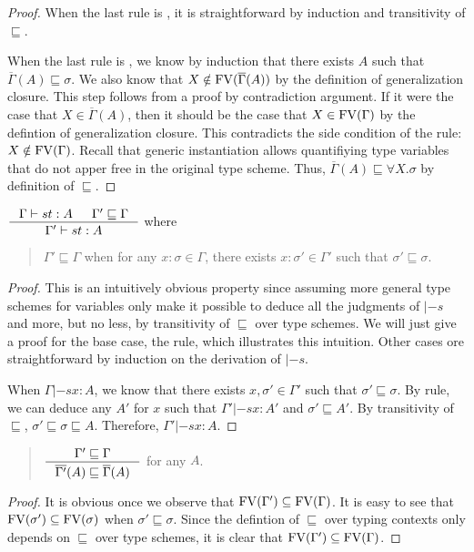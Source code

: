 \begin{proof}
When the last rule is , it is straightforward by induction
and transitivity of $\sqsubseteq$.

When the last rule is , we know by induction that there exists
$A$ such that $\overline{\Gamma}(A) \sqsubseteq \sigma$. We also know
that $X \notin\mathop{\mathrm{FV}}(\overline{\Gamma}(A))$ by the definition of generalization closure.
This step follows from a proof by contradiction argument.
If it were the case that $X\in\overline{\Gamma}(A)$, then it should be the case that
$X\in\mathop{\mathrm{FV}}(\Gamma)$
by the defintion of generalization closure. This contradicts the side condition of
the  rule: $X\notin\mathop{\mathrm{FV}}(\Gamma)$.
Recall that generic instantiation allows quantifiying type variables
that do not apper free in the original type scheme. Thus,
$\overline{\Gamma}(A) \sqsubseteq \forall X.\sigma$ by definition
of $\sqsubseteq$.
\end{proof}

\begin{lemma} \label{lem:genGamma}
$ \inference{\Gamma |-s t : A & \Gamma' \sqsubseteq \Gamma}
	    {\Gamma' |-s t : A} $ where
\begin{quote}
$\Gamma' \sqsubseteq \Gamma$ when for any $x:\sigma\in \Gamma$,
there exists $x:\sigma'\in\Gamma'$ such that $\sigma'\sqsubseteq\sigma$.
\end{quote}
\label{lem:generalizeGamma}
\end{lemma}
\begin{proof}
This is an intuitively obvious property since assuming
more general type schemes for variables only make
it possible to deduce all the judgments of $|-s$ and more, but no less,
by transitivity of $\sqsubseteq$ over type schemes.
We will just give a proof for the base case, the  rule,
which illustrates this intuition.
Other cases ore straightforward by induction on the derivation of $|-s$.

When $\Gamma |-s x : A$, we know that there exists
$x,\sigma'\in\Gamma'$ such that $\sigma'\sqsubseteq\sigma$.
By  rule, we can deduce any $A'$ for $x$
such that $\Gamma' |-s x : A'$ and $\sigma'\sqsubseteq A'$.
By transitivity of $\sqsubseteq$, $\sigma' \sqsubseteq \sigma \sqsubseteq A$.
Therefore, $\Gamma' |-s x : A$.
\end{proof}

\begin{lemma}
\begin{quote}
$ \inference{\Gamma' \sqsubseteq \Gamma}
	    {\overline{\Gamma'}(A) \sqsubseteq \overline{\Gamma}(A)} $
for any $A$.
\end{quote}
\label{lem:closureMoreGen}
\end{lemma}
\begin{proof}
It is obvious once we observe that $\mathop{\mathrm{FV}}(\Gamma') \subseteq \mathop{\mathrm{FV}}(\Gamma)$.
It is easy to see that $\mathop{\mathrm{FV}}(\sigma') \subseteq \mathop{\mathrm{FV}}(\sigma)$
when $\sigma' \sqsubseteq \sigma$. Since the defintion of $\sqsubseteq$
over typing contexts only depends on $\sqsubseteq$ over type schemes,
it is clear that $\mathop{\mathrm{FV}}(\Gamma') \subseteq \mathop{\mathrm{FV}}(\Gamma)$.
\end{proof}

